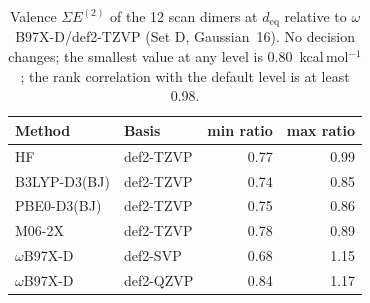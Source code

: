 \begin{table}[!htbp]\centering\small
\caption{Valence $\Sigma E^{(2)}$ of the 12 scan dimers at $d_\mathrm{eq}$ relative to $\omega$B97X-D/def2-TZVP (Set D, Gaussian~16). No decision changes; the smallest value at any level is 0.80~kcal\,mol$^{-1}$; the rank correlation with the default level is at least 0.98.}\label{tab:levels}
\begin{tabular}{llrr}\toprule Method & Basis & min ratio & max ratio\\\midrule
HF & def2-TZVP & 0.77 & 0.99\\
B3LYP-D3(BJ) & def2-TZVP & 0.74 & 0.85\\
PBE0-D3(BJ) & def2-TZVP & 0.75 & 0.86\\
M06-2X & def2-TZVP & 0.78 & 0.89\\
$\omega$B97X-D & def2-SVP & 0.68 & 1.15\\
$\omega$B97X-D & def2-QZVP & 0.84 & 1.17\\
\bottomrule\end{tabular}\end{table}
